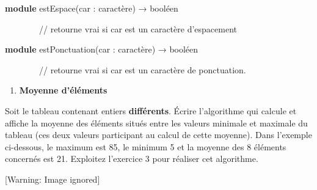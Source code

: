 \bigskip

{\sffamily
\textbf{module} estEspace(car : caractère) → booléen }

{\sffamily
\ \ \ \ \ \ \ \ // retourne vrai si car est un caractère d’espacement}

{\sffamily
\textbf{module} estPonctuation(car : caractère) → booléen }

{\sffamily
\ \ \ \ \ \ \ \ // retourne vrai si car est un caractère de ponctuation.
}


\bigskip

\liststyleExercice
\setcounter{saveenum}{\value{enumi}}
\begin{enumerate}
\setcounter{enumi}{\value{saveenum}}
\item {\sffamily\bfseries
Moyenne d'éléments}
\end{enumerate}
{
Soit le tableau  contenant
 entiers \textbf{différents}. Écrire l’algorithme
qui calcule et affiche la moyenne des éléments situés entre les valeurs
minimale et maximale du tableau (ces deux valeurs participant au calcul
de cette moyenne). Dans l’exemple ci-dessous, le maximum est 85, le
minimum 5 et la moyenne des 8 éléments concernés est 21. Exploitez
l'exercice 3 pour réaliser cet algorithme.}

\begin{center}
 [Warning: Image ignored] %

\end{center}
\begin{center}
\tablehead{}
\begin{supertabular}{|m{0.47000003cm}|m{0.47000003cm}|m{0.47000003cm}|m{0.47000003cm}|m{0.315cm}|m{0.31700003cm}|m{0.47000003cm}|m{0.47000003cm}|m{0.31700003cm}|m{0.47000003cm}|m{0.47000003cm}|m{0.47000003cm}|m{0.47000003cm}|m{0.47000003cm}|m{0.47000003cm}|m{0.47000003cm}|m{0.47000003cm}|m{0.47000003cm}|m{0.47000003cm}|m{0.48800004cm}|}
\hline
{} &
 &
 &
 &
 &
 &
 &
 &
 &
 &
 &
 &
 &
 &
 &
 &
 &
 &
 &
\centering{}\\\hline
\end{supertabular}
\end{center}

